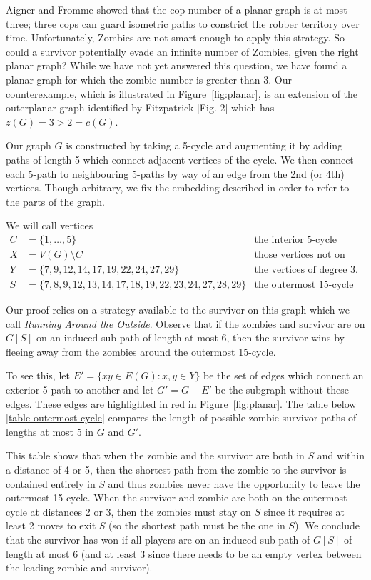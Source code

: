Aigner and Fromme \cite{aigner1984game} showed that the cop number of a planar graph is at most three;
three cops can guard isometric paths to constrict the robber territory over time.
Unfortunately, Zombies are not smart enough to apply this strategy. So could a survivor
potentially evade an infinite number of Zombies, given the right planar graph?
While we have not yet answered this question, we have found a planar graph for which the zombie number is greater than 3.
Our counterexample, which is illustrated in Figure~\ref{fig:planar}, is an extension of the outerplanar graph identified by Fitzpatrick \cite{fitzpatrick2016deterministic}[Fig. 2] which has
$z(G) = 3 > 2 = c(G)$.

Our graph $G$ is constructed by taking a 5-cycle and augmenting it by adding paths of length 5 which
connect adjacent vertices of the cycle. We then connect each 5-path to neighbouring 5-paths by way of an edge from the 2nd (or 4th) vertices. Though arbitrary, we fix the embedding described in order to refer to the parts of the graph.

We will call vertices
\begin{align*}
C &= \{ 1, \dots, 5 \} & \text{the interior 5-cycle} \\
X &= V(G) \setminus C & \text{those vertices not on the interior 5-cycle} \\
Y &= \{7, 9, 12, 14, 17, 19, 22, 24, 27, 29\} & \text{the vertices of degree 3.} \\
S &= \{ 7,8,9,12,13,14,17,18,19, 22,23,24,27,28,29 \} & \text{the outermost 15-cycle}
\end{align*}

Our proof relies on a strategy available to the survivor on this graph which we call \textit{Running Around the Outside}. Observe that if the zombies and survivor are on $G[S]$ on an induced sub-path of length at most 6, then the survivor wins by fleeing away from the zombies around the outermost 15-cycle.

To see this, let $E' = \{xy \in E(G) : x, y \in Y\}$ be the set of edges which connect an exterior 5-path to another and let $G' = G - E'$ be the subgraph without these edges. These edges are highlighted in red in Figure~\ref{fig:planar}.
The table below \ref{table outermost cycle} compares the length of possible zombie-survivor paths of
lengths at most 5 in $G$ and $G'$.

This table shows that when the zombie and the survivor are both in $S$ and within a distance of 4 or 5, then the shortest path from the zombie to the survivor is contained entirely in $S$ and thus zombies never have the opportunity to leave the outermost 15-cycle.
When the survivor and zombie are both on the outermost cycle at distances 2 or 3, then the zombies must stay on $S$ since it requires at least 2 moves to exit $S$ (so the shortest path must be the one in $S$). We conclude that the survivor has won if all players are on an induced sub-path of $G[S]$ of length at most 6 (and at least 3 since there needs to be an empty vertex between the leading zombie and survivor).

